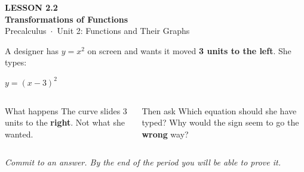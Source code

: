 \documentclass[aspectratio=169, 11pt]{beamer}
\begin{document}
{
\begin{frame}[plain]
  \vspace{2.8cm}\hspace{0.55cm}%
  \begin{minipage}{0.9\textwidth}
    {\color{goldacc}\bfseries\small LESSON 2.2}\\[0.5cm]
    {\color{white}\bfseries\LARGE Transformations of Functions}\\[1.2cm]
    {\color{lilacmid}\small Precalculus~$\cdot$~Unit 2: Functions and Their Graphs}
  \end{minipage}
\end{frame}
}

\begin{frame}[t, plain]

  A designer has \(y = x^2\) on screen and wants it moved \textbf{3 units to the left}.
  She types:

  \bigskip
  \begin{center}
    {\Huge\bfseries\color{plum} \(y = (x - 3)^2\)}
  \end{center}

  \bigskip
  \begin{columns}[T]
      \begin{block}{What happens}
        The curve slides 3 units to the \textbf{right}. Not what she wanted.
      \end{block}

      \begin{block}{Then ask}
        Which equation should she have typed? Why would the sign seem to go the
        \textbf{wrong} way?
      \end{block}
  \end{columns}

  \bigskip
  \textit{Commit to an answer. By the end of the period you will be able to prove it.}
\end{frame}
\end{document}
